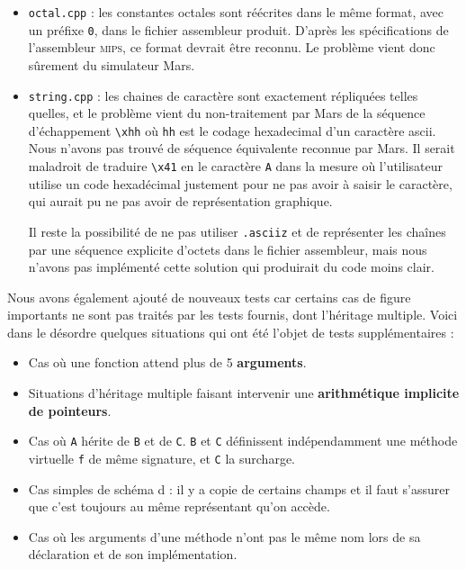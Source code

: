 \documentclass[11pt, a4paper]{article}
\newcommand{\prog}[1]{{\tt#1}}
\begin{document}
\begin{itemize}
\item \prog{octal.cpp} : les constantes octales sont réécrites dans le même format, avec un préfixe \prog{0}, dans le fichier assembleur produit. D'après les spécifications de l'assembleur \textsc{mips}, ce format devrait être reconnu. Le problème vient donc sûrement du simulateur Mars.
\item \prog{string.cpp} : les chaines de caractère sont exactement répliquées telles quelles, et le problème vient du non-traitement par Mars de la séquence d'échappement \prog{\textbackslash{}xhh} où \prog{hh} est le codage hexadecimal d'un caractère ascii. Nous n'avons pas trouvé de séquence équivalente reconnue par Mars. Il serait maladroit de traduire \prog{\textbackslash{}x41} en le caractère \prog{A} dans la mesure où l'utilisateur utilise un code hexadécimal justement pour ne pas avoir à saisir le caractère, qui aurait pu ne pas avoir de représentation graphique.

Il reste la possibilité de ne pas utiliser \prog{.asciiz} et de représenter les chaînes par une séquence explicite d'octets dans le fichier assembleur, mais nous n'avons pas implémenté cette solution qui produirait du code moins clair.
\end{itemize}

\medskip

Nous avons également ajouté de nouveaux tests car certains cas de figure importants ne sont pas traités par les tests fournis, dont l'héritage multiple. Voici dans le désordre quelques situations qui ont été l'objet de tests supplémentaires : 

\begin{itemize}
\item Cas où une fonction attend plus de 5 \textbf{arguments}.
\item Situations d'héritage multiple faisant intervenir une \textbf{arithmétique implicite de pointeurs}.
\item Cas où \prog{A} hérite de \prog{B} et de \prog{C}. \prog{B} et \prog{C} définissent indépendamment une méthode virtuelle \prog{f} de même signature, et \prog{C} la surcharge.
\item Cas simples de schéma d : il y a copie de certains champs et il faut s'assurer que c'est toujours au même représentant qu'on accède.
\item Cas où les arguments d'une méthode n'ont pas le même nom lors de sa déclaration et de son implémentation. 
\end{itemize}
\end{document}
